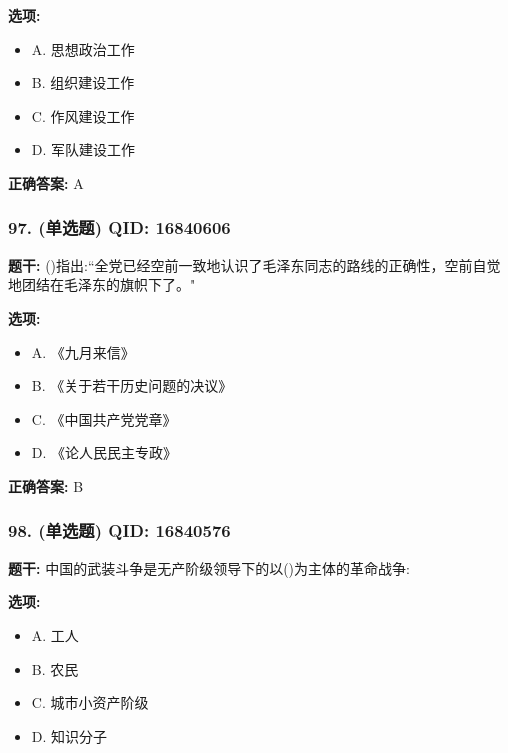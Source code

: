 \documentclass[12pt,UTF8]{ctexart}
\begin{document}
\textbf{选项:}
\begin{itemize}[leftmargin=*]

  \item A. 思想政治工作

  \item B. 组织建设工作

  \item C. 作风建设工作

  \item D. 军队建设工作

\end{itemize}

\textbf{正确答案:}
A

\vspace{0.3em}\hrulefill\vspace{0.7em}

\subsubsection*{97. (单选题) \small QID: 16840606}

\textbf{题干:}
()指出:“全党已经空前一致地认识了毛泽东同志的路线的正确性，空前自觉地团结在毛泽东的旗帜下了。"

\textbf{选项:}
\begin{itemize}[leftmargin=*]

  \item A. 《九月来信》

  \item B. 《关于若干历史问题的决议》

  \item C. 《中国共产党党章》

  \item D. 《论人民民主专政》

\end{itemize}

\textbf{正确答案:}
B

\vspace{0.3em}\hrulefill\vspace{0.7em}

\subsubsection*{98. (单选题) \small QID: 16840576}

\textbf{题干:}
中国的武装斗争是无产阶级领导下的以()为主体的革命战争:

\textbf{选项:}
\begin{itemize}[leftmargin=*]

  \item A. 工人

  \item B. 农民

  \item C. 城市小资产阶级

  \item D. 知识分子

\end{itemize}
\end{document}
